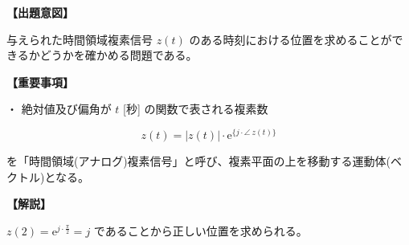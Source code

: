 \noindent \textbf{【出題意図】}

\bigskip
\noindent 与えられた時間領域複素信号 $z(t)$ のある時刻における位置を求めることができるかどうかを確かめる問題である。

\vspace{1em}
\noindent \textbf{【重要事項】}

\bigskip
\noindent ・ 絶対値及び偏角が $t$ [秒] の関数で表される複素数

\[
z(t) = |z(t)| \cdot \textrm{e}^{\{j \cdot \angle \ z(t)\}}
\]

\medskip
\noindent を「時間領域(アナログ)複素信号」と呼び、複素平面の上を移動する運動体(ベクトル)となる。

\vspace{1em}
\noindent \textbf{【解説】}

\bigskip
\noindent $z(2) = \textrm{e}^{ j \cdot \frac{\pi}{2}} = j$ であることから正しい位置を求められる。
